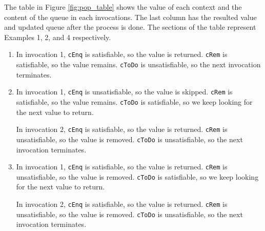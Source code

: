 The table in Figure \ref{fig:pop_table} shows the value of each context and the content of the queue in each invocations. The last column has the resulted value and updated queue after the process is done. The sections of the table represent Examples 1, 2, and 4 respectively.  

\begin{enumerate}[label=Example \arabic*:]
\item In invocation 1, \texttt{cEnq} is satisfiable, so the value is returned. \texttt{cRem} is satisfiable, so the value remains. \texttt{cToDo} is unsatisfiable, so the next invocation terminates. 

\item In invocation 1, \texttt{cEnq} is unsatisfiable, so the value is skipped. \texttt{cRem} is satisfiable, so the value remains. \texttt{cToDo} is satisfiable, so we keep looking for the next value to return. 

In invocation 2, \texttt{cEnq} is satisfiable, so the value is returned. \texttt{cRem} is unsatisfiable, so the value is removed. \texttt{cToDo} is unsatisfiable, so the next invocation terminates. 

\item In invocation 1, \texttt{cEnq} is satisfiable, so the value is returned. \texttt{cRem} is unsatisfiable, so the value is removed. \texttt{cToDo} is satisfiable, so we keep looking for the next value to return. 

In invocation 2, \texttt{cEnq} is satisfiable, so the value is returned. \texttt{cRem} is unsatisfiable, so the value is removed. \texttt{cToDo} is unsatisfiable, so the next invocation terminates. 

\end{enumerate}

